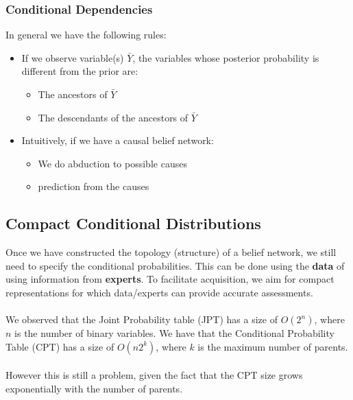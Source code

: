 \documentclass{article}
\def\red#1{{\color{red}#1}}
\newcommand{\centerfig}[2]{\begin{center}\texttt{[image: \#2]}\end{center}}
\begin{document}
\subsubsection*{Conditional Dependencies}
In general we have the following rules:
\begin{itemize}
	\item If we observe variable(s) $ \bar{Y} $, the variables whose posterior probability is different from the prior are:
	\begin{itemize}[label=$\rightarrow$]
		\item The ancestors of $ \bar{Y} $
		\item The descendants of the ancestors of $\bar{Y}$
	\end{itemize}
\item Intuitively, if we have a causal belief network:
\begin{itemize}[label=$\rightarrow$]
	\item We do \red{abduction} to possible causes
	\item \red{prediction} from the causes
\end{itemize}
\end{itemize}


\subsection*{Compact Conditional Distributions}
Once we have constructed the topology (structure) of a belief network, we still need to specify the conditional probabilities. This can be done using the \textbf{data} of using information from \textbf{experts}. To facilitate acquisition, we aim for compact representations for which data/experts can provide accurate assessments.\\
\\
We observed that the Joint Probability table (JPT) has a size of $ O(2^n) $, where $ n $ is the number of binary variables. We have that the Conditional Probability Table (CPT) has a size of $ O(n2^k) $, where $ k $ is the maximum number of parents. \\
\\
However this is still a problem, given the fact that the CPT size grows exponentially with the number of parents. 
\end{document}
